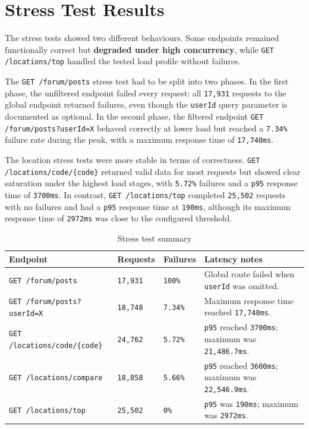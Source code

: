 \newpage 

\section{Stress Test Results}

The stress tests showed two different behaviours. Some endpoints remained functionally correct but \textbf{degraded under high concurrency}, while \texttt{GET /locations/top} handled the tested load profile without failures.

The \texttt{GET /forum/posts} stress test had to be split into two phases. In the first phase, the unfiltered endpoint failed every request: all \texttt{17,931} requests to the global endpoint returned failures, even though the \texttt{userId} query parameter is documented as optional. In the second phase, the filtered endpoint \texttt{GET /forum/posts?userId=X} behaved correctly at lower load but reached a \texttt{7.34\%} failure rate during the peak, with a maximum response time of \texttt{17,740ms}.

The location stress tests were more stable in terms of correctness. \texttt{GET /locations/code/\{code\}} returned valid data for most requests but showed clear saturation under the highest load stages, with \texttt{5.72\%} failures and a \texttt{p95} response time of \texttt{3700ms}. In contrast, \texttt{GET /locations/top} completed \texttt{25,502} requests with no failures and had a \texttt{p95} response time at \texttt{190ms}, although its maximum response time of \texttt{2972ms} was close to the configured threshold.

\begin{table}[H]
    \centering
    \caption{Stress test summary}
    \label{tab:g16_stress_summary}
    \begin{tabular}{p{} p{} p{} p{}}
    \hline
    \textbf{Endpoint} & \textbf{Requests} & \textbf{Failures} & \textbf{Latency notes} \\\hline
    \texttt{GET /forum/posts} & \texttt{17,931} & \texttt{100\%} & Global route failed when \texttt{userId} was omitted. \\
    \texttt{GET /forum/posts?userId=X} & \texttt{18,748} & \texttt{7.34\%} & Maximum response time reached \texttt{17,740ms}. \\
    \texttt{GET /locations/code/\{code\}} & \texttt{24,762} & \texttt{5.72\%} & \texttt{p95} reached \texttt{3700ms}; maximum was \texttt{21,486.7ms}. \\
    \texttt{GET /locations/compare} & \texttt{18,858} & \texttt{5.66\%} & \texttt{p95} reached \texttt{3600ms}; maximum was \texttt{22,546.9ms}. \\
    \texttt{GET /locations/top} & \texttt{25,502} & \texttt{0\%} & \texttt{p95} was \texttt{190ms}; maximum was \texttt{2972ms}. \\\hline
    \end{tabular}
\end{table}

